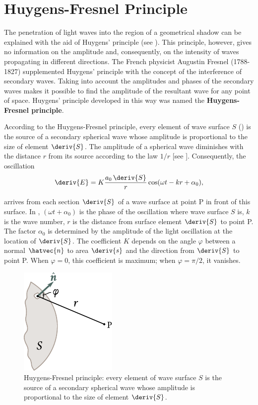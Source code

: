 \section{Huygens-Fresnel Principle}\label{sec:18_2}

The penetration of light waves into the region of a geometrical shadow can be explained with the aid of Huygens' principle (see ).
This principle, however, gives no information on the amplitude and, consequently, on the intensity of waves propagating in different directions.
The French physicist Augustin Fresnel (1788-1827) supplemented Huygens' principle with the concept of the interference of secondary waves.
Taking into account the amplitudes and phases of the secondary waves makes it possible to find the amplitude of the resultant wave for any point of
space.
Huygens' principle developed in this way was named the \textbf{Huygens-Fresnel principle}.

According to the Huygens-Fresnel principle, every element of wave surface $S$ () is the source of a secondary spherical wave whose amplitude is proportional to the size of element $\deriv{S}$.
The amplitude of a spherical wave diminishes with the distance $r$ from its source according to the law $1/r$ [see ].
Consequently, the oscillation
\begin{equation}\label{eq:18_1}
    \deriv{E} = K \frac{a_0\, \deriv{S}}{r} \cos(\omega t - kr + \alpha_0),
\end{equation}

\noindent
arrives from each section $\deriv{S}$ of a wave surface at point P in front of this surface.
In , $(\omega t+\alpha_0)$ is the phase of the oscillation where wave surface $S$ is, $k$ is the wave number, $r$ is the distance from surface element $\deriv{S}$ to point P.
The factor $\alpha_0$ is determined by the amplitude of the light oscillation at the location of $\deriv{S}$.
The coefficient $K$ depends on the angle $\varphi$ between a normal $\hatvec{n}$ to area $\deriv{s}$ and the direction from $\deriv{S}$ to point P.
When $\varphi=0$, this coefficient is maximum; when $\varphi=\pi/2$, it vanishes.

\begin{figure}[!htb]
	\begin{center}
		\includegraphics[scale=1]{figures/ch_18/fig_18_2.pdf}
        \caption[]{Huygens-Fresnel principle: every element of wave surface $S$ is the source of a secondary spherical wave whose amplitude is proportional to the size of element $\deriv{S}$.}
		\label{fig:18_2}
	\end{center}
	\vspace{-0.8cm}
\end{figure}

